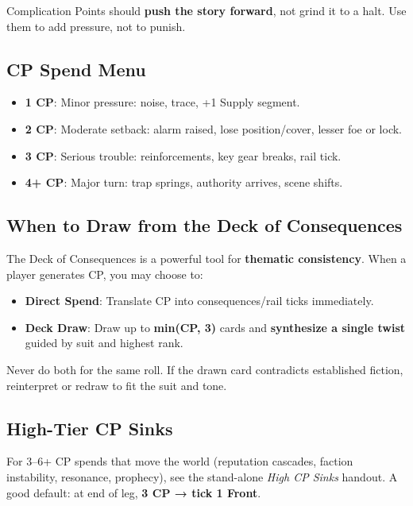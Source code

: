 Complication Points should \textbf{push the story forward}, not grind it to a halt. Use them to add pressure, not to punish.

\subsection{CP Spend Menu}

\begin{itemize}
    \item \textbf{1 CP}: Minor pressure: noise, trace, +1 Supply segment.
    \item \textbf{2 CP}: Moderate setback: alarm raised, lose position/cover, lesser foe or lock.
    \item \textbf{3 CP}: Serious trouble: reinforcements, key gear breaks, rail tick.
    \item \textbf{4+ CP}: Major turn: trap springs, authority arrives, scene shifts.
\end{itemize}

\subsection{When to Draw from the Deck of Consequences}

The Deck of Consequences is a powerful tool for \textbf{thematic consistency}. When a player generates CP, you may choose to:

\begin{itemize}
    \item \textbf{Direct Spend}: Translate CP into consequences/rail ticks immediately.
    \item \textbf{Deck Draw}: Draw up to \textbf{min(CP, 3)} cards and \textbf{synthesize a single twist} guided by suit and highest rank.
\end{itemize}

Never do both for the same roll. If the drawn card contradicts established fiction, reinterpret or redraw to fit the suit and tone.

\subsection{High-Tier CP Sinks}
For 3--6+ CP spends that move the world (reputation cascades, faction instability, resonance, prophecy), see the stand-alone \emph{High CP Sinks} handout. A good default: at end of leg, \textbf{3 CP → tick 1 Front}.

